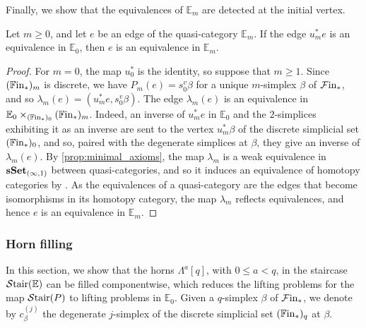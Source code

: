 \documentclass[10pt,reqno]{amsart}
\begin{document}
Finally, we show that the equivalences of $\mathbb E_m$ are detected
at the initial vertex.

\begin{lemma}
\label{lem:source_evaluation_reflects_equivalences}
Let $m\geq0$, and let $e$ be an edge of the quasi-category
$\mathbb E_m$. If the edge $u_m^*e$ is an equivalence in
$\mathbb E_0$, then $e$ is an equivalence in $\mathbb E_m$.
\end{lemma}

\begin{proof}
For $m=0$, the map $u_0^*$ is the identity, so suppose that
$m\geq1$. Since $(\mathbb{F}\mathrm{in}_*)_m$ is discrete, we have
$P_m(e)=s_0^v\beta$ for a unique $m$-simplex $\beta$ of
$\mathcal{F}\mathrm{in}_*$, and so $\lambda_m(e)=(u_m^*e,s_0^v\beta)$. The edge
$\lambda_m(e)$ is an equivalence in
$\mathbb E_0\times_{(\mathbb{F}\mathrm{in}_*)_0}(\mathbb{F}\mathrm{in}_*)_m$. Indeed, an inverse
of $u_m^*e$ in $\mathbb E_0$ and the $2$-simplices exhibiting it
as an inverse are sent to the vertex $u_m^*\beta$ of the discrete
simplicial set $(\mathbb{F}\mathrm{in}_*)_0$, and so, paired with the degenerate
simplices at $\beta$, they give an inverse of $\lambda_m(e)$. By
\cref{prop:minimal_axioms}, the map $\lambda_m$ is a weak
equivalence in $\mathbf{sSet}_{(\infty,1)}$ between quasi-categories, and so
it induces an equivalence of homotopy categories by
\cite[Proposition~1.23]{Joyal2008Theory}. As the equivalences of a
quasi-category are the edges that become isomorphisms in its homotopy
category, the map $\lambda_m$ reflects equivalences, and hence $e$
is an equivalence in $\mathbb E_m$.
\end{proof}

\subsubsection{Horn filling}
\label{subsubsec:staircase_inner_horns}

In this section, we show that the horns $\Lambda^a[q]$, with
$0\leq a<q$, in the staircase $\mathcal{S}\mathrm{tair}(\mathbb E)$ can be filled
componentwise, which reduces the lifting problems for the map
$\mathcal{S}\mathrm{tair}(P)$ to lifting problems in $\mathbb E_0$. Given a
$q$-simplex $\beta$ of $\mathcal{F}\mathrm{in}_*$, we denote by
$c_\beta^{(j)}$ the degenerate $j$-simplex of the discrete
simplicial set $(\mathbb{F}\mathrm{in}_*)_q$ at $\beta$.
\end{document}
